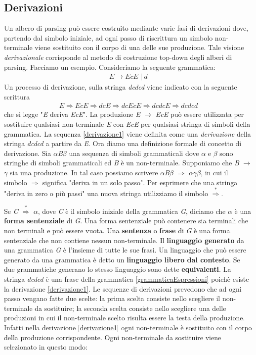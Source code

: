 \subsection{Derivazioni}
Un albero di parsing \cite{libro: compilatori} può essere costruito mediante varie fasi di derivazioni dove, partendo dal simbolo iniziale, ad ogni passo di riscrittura un simbolo non-terminale viene sostituito con il corpo di una delle sue produzione. Tale visione \textit{derivazionale} corrisponde al metodo di costruzione top-down degli alberi di parsing.
Facciamo un esempio. Consideriamo la seguente grammatica:
\begin{align}\label{grammaticaEspressioni}
	E \to EcE \mid d 
\end{align}
Un processo di derivazione, sulla stringa \textit{dcdcd} viene indicato con la seguente scrittura
\begin{align}\label{derivazione1}
	E \Rightarrow EcE \Rightarrow dcE \Rightarrow dcEcE \Rightarrow dcdcE \Rightarrow dcdcd
\end{align}
che si legge "\textit{E} deriva \textit{EcE}". La produzione \textit{E} $\to$ \textit{EcE} può essere utilizzata per sostituire qualsiasi non-terminale \textit{E} con \textit{EcE} per qualsiasi stringa di simboli della grammatica. La sequenza \ref{derivazione1} viene definita come una \textit{derivazione} della stringa \textit{dcdcd} a partire da \textit{E}. Ora diamo una definizione formale di concetto di derivazione. Sia  $\alpha$\textit{B}$\beta$ una sequenza di simboli grammaticali  dove $\alpha$ e $\beta$ sono stringhe di simboli grammaticali ed \textit{B} è un non-terminale. Supponiamo che \textit{B} $\to$ $\gamma$ sia una produzione. In tal caso possiamo scrivere $\alpha$\textit{B}$\beta$ $\Rightarrow$ $\alpha$$\gamma$$\beta$, in cui il simbolo $\Rightarrow$ significa "deriva in un solo passo". Per esprimere che una stringa "deriva in zero o più passi" una nuova stringa utilizziamo il simbolo $\overset{*}{\Rightarrow}$.\par 
\noindent Se \textit{C} $\overset{*}{\Rightarrow}$ $\alpha$, dove \textit{C} è il simbolo iniziale della grammatica \textit{G}, diciamo che $\alpha$ è una \textbf{forma sentenziale}  di \textit{G}. Una forma sentenziale può contenere sia terminali che non terminali e può essere vuota. Una \textbf{sentenza} o \textbf{frase} di \textit{G} è una forma sentenziale che non contiene nessun non-terminale. Il \textbf{linguaggio generato} da una grammatica \textit{G} è l'insieme di tutte le sue frasi. Un linguaggio che può essere generato da una grammatica è detto un \textbf{linguaggio libero dal contesto}. Se due grammatiche generano lo stesso linguaggio sono dette \textbf{equivalenti}. La stringa \textit{dcdcd} è una frase della grammatica \ref{grammaticaEspressioni} poichè esiste la derivazione \ref{derivazione1}. Le sequenze di derivazioni prevedono che ad ogni passo vengano fatte due scelte: la prima scelta consiste nello scegliere il non-terminale da sostituire; la seconda scelta consiste nello scegliere una delle produzioni in cui il non-terminale scelto risulta essere la testa della produzione. Infatti nella derivazione \ref{derivazione1} ogni non-terminale è sostituito con il corpo della produzione corrispondente. Ogni non-terminale da sostituire viene selezionato in questo modo:
